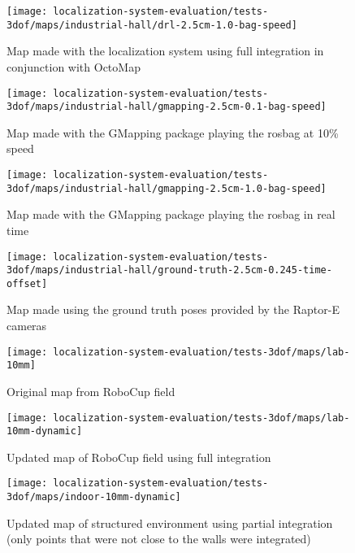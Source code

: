 \begin{figure}[H]
	\centering
	\texttt{[image: localization-system-evaluation/tests-3dof/maps/industrial-hall/drl-2.5cm-1.0-bag-speed]}
	\caption{Map made with the localization system using full integration in conjunction with OctoMap}
	\label{fig:localization-system-evaluation_drl-2.5cm-1.0-bag-speed}
\end{figure}

\begin{figure}[H]
	\centering
	\texttt{[image: localization-system-evaluation/tests-3dof/maps/industrial-hall/gmapping-2.5cm-0.1-bag-speed]}
	\caption{Map made with the GMapping package playing the rosbag at 10\% speed}
	\label{fig:localization-system-evaluation_gmapping-2.5cm-0.1-bag-speed}
\end{figure}

\begin{figure}[H]
	\centering
	\texttt{[image: localization-system-evaluation/tests-3dof/maps/industrial-hall/gmapping-2.5cm-1.0-bag-speed]}
	\caption{Map made with the GMapping package playing the rosbag in real time}
	\label{fig:localization-system-evaluation_gmapping-2.5cm-1.0-bag-speed}
\end{figure}

\begin{figure}[H]
	\centering
	\texttt{[image: localization-system-evaluation/tests-3dof/maps/industrial-hall/ground-truth-2.5cm-0.245-time-offset]}
	\caption{Map made using the ground truth poses provided by the Raptor-E cameras}
	\label{fig:localization-system-evaluation_ground-truth-2.5cm-0.245-time-offset}
\end{figure}


\begin{figure}[H]
	\centering
	\texttt{[image: localization-system-evaluation/tests-3dof/maps/lab-10mm]}
	\caption{Original map from RoboCup field}
	\label{fig:localization-system-evaluation_lab-10mm}
\end{figure}

\begin{figure}[H]
	\centering
	\texttt{[image: localization-system-evaluation/tests-3dof/maps/lab-10mm-dynamic]}
	\caption{Updated map of RoboCup field using full integration}
	\label{fig:localization-system-evaluation_lab-10mm-dynamic}
\end{figure}

\begin{figure}[H]
	\centering
	\texttt{[image: localization-system-evaluation/tests-3dof/maps/indoor-10mm-dynamic]}
	\caption{Updated map of structured environment using partial integration (only points that were not close to the walls were integrated)}
	\label{fig:localization-system-evaluation_indoor-10mm-dynamic}
\end{figure}



